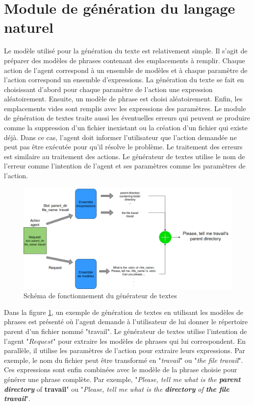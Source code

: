 \section{Module de génération du langage naturel}
Le modèle utilisé pour la génération du texte est relativement simple. Il s'agit de préparer des modèles de phrases contenant des emplacements à remplir. Chaque action de l'agent correspond à un ensemble de modèles et à chaque paramètre de l'action correspond un ensemble d'expressions. La génération du texte se fait en choisissant d'abord pour chaque paramètre de l'action une expression aléatoirement. Ensuite, un modèle de phrase est choisi aléatoirement. Enfin, les emplacements vides sont remplis avec les expressions des paramètres. Le module de génération de textes traite aussi les éventuelles erreurs qui peuvent se produire comme la suppression d'un fichier inexistant ou la création d'un fichier qui existe déjà. Dans ce cas, l'agent doit informer l'utilisateur que l'action demandée ne peut pas être exécutée pour qu'il résolve le problème. Le traitement des erreurs est similaire au traitement des actions. Le générateur de textes utilise le nom de l'erreur comme l'intention de l'agent et ses paramètres comme les paramètres de l'action.
\begin{figure}[H] 
	\centering
	\includegraphics[width=0.95\linewidth]{images/Conception/NLG.png}
	\caption{Schéma de fonctionnement du générateur de textes}\label{nlg_schema}
\end{figure}
Dans la figure \ref{nlg_schema}, un exemple de génération de textes en utilisant les modèles de phrases est présenté où l'agent demande à l'utilisateur de lui donner le répertoire parent d'un fichier nommé "travail". Le générateur de textes utilise l'intention de l'agent "$Request$" pour extraire les modèles de phrases qui lui correspondent. En parallèle, il utilise les paramètres de l'action pour extraire leurs expressions. Par exemple, le nom du fichier peut être transformé en "\textit{travail}" ou "\textit{the file travail}". Ces expressions sont enfin combinées avec le modèle de la phrase choisie pour générer une phrase complète. Par exemple, "\textit{Please, tell me what is the \textbf{parent directory}} of \textbf{travail}" ou "\textit{Please, tell me what is the \textbf{directory} of \textbf{the file travail}}".
